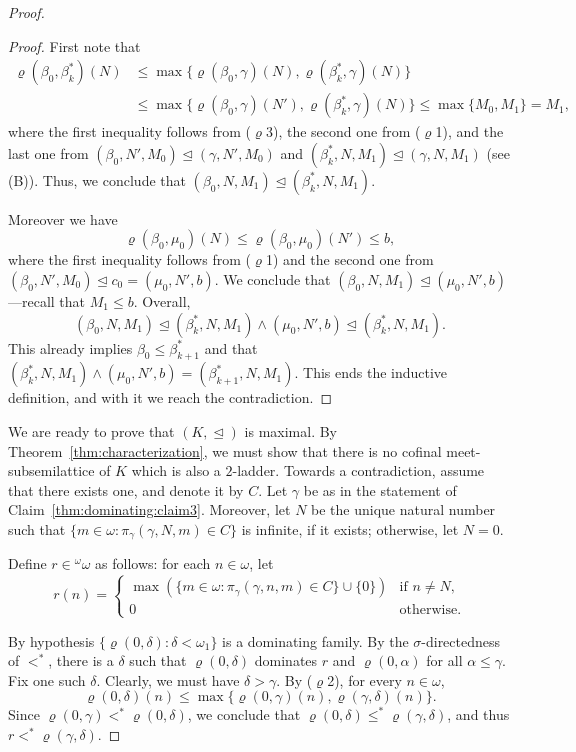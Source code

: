 \documentclass[]{amsart}
\theoremstyle{definition}
\theoremstyle{remark}
\begin{document}
\begin{proof}
\begin{proof}
First note that 
\begin{align*}
\varrho(\beta_0, \beta^*_k)(N) &\le  \max\{\varrho(\beta_0, \gamma)(N), \varrho(\beta^*_k, \gamma)(N)\}\\&\le \max\{\varrho(\beta_0, \gamma)(N'), \varrho(\beta^*_k, \gamma)(N)\} \le \max\{M_0, M_1\} = M_1,
\end{align*}
where the first inequality follows from ($\varrho$3), the second one from ($\varrho$1), and the last one from $(\beta_0, N', M_0) \trianglelefteq (\gamma, N', M_0)$ and $(\beta^*_k, N, M_1) \trianglelefteq (\gamma, N, M_1)$ (see (B)). Thus, we conclude that $(\beta_0, N, M_1) \trianglelefteq (\beta^*_k, N, M_1)$.


Moreover we have
\[
\varrho(\beta_0, \mu_0)(N) \le \varrho(\beta_0, \mu_0)(N') \le b,
\]
where the first inequality follows from ($\varrho$1) and the second one from $(\beta_0, N', M_0) \trianglelefteq c_0 = (\mu_0, N', b)$.
We conclude that $(\beta_0, N, M_1) \trianglelefteq (\mu_0, N', b)$---recall that $M_1 \le b$. Overall,
\[
(\beta_0, N, M_1) \trianglelefteq (\beta^*_k, N, M_1) \wedge (\mu_0, N', b) \trianglelefteq (\beta^*_k, N, M_1).
\]
This already implies $\beta_0 \le \beta^*_{k+1}$ and that $(\beta^*_k, N, M_1) \wedge (\mu_0, N', b) = (\beta^*_{k+1}, N, M_1)$. This ends the inductive definition, and with it we reach the contradiction.
\end{proof}

We are ready to prove that $(K, \trianglelefteq)$ is maximal. By Theorem~\ref{thm:characterization}, we must show that there is no cofinal meet-subsemilattice of $K$ which is also a $2$-ladder. Towards a contradiction, assume that there exists one, and denote it by $C$. Let $\gamma$ be as in the statement of Claim~\ref{thm:dominating:claim3}. Moreover, let $N$ be the unique natural number such that $\{m \in \omega : \pi_\gamma (\gamma, N, m) \in C\}$ is infinite, if it exists; otherwise, let $N = 0$.

Define $r \in {}^\omega \omega$ as follows: for each $n \in \omega$, let
\[
r(n) = \begin{cases}
\max (\{m\in\omega : \pi_\gamma (\gamma, n, m) \in C\} \cup \{0\}) &\text{if } n \neq N,\\
0 &\text{otherwise}.
\end{cases}
\]

By hypothesis $\{\varrho(0, \delta):\delta < \omega_1\}$ is a dominating family. By the $\sigma$-directedness of $<^*$, there is a $\delta$ such that $\varrho(0, \delta)$ dominates $r$ and $\varrho(0, \alpha)$ for all $\alpha \le \gamma$. Fix one such $\delta$. Clearly, we must have $\delta > \gamma$. By ($\varrho$2), for every $n \in \omega$,
\[
\varrho(0, \delta)(n) \le \max\{\varrho(0, \gamma)(n), \varrho(\gamma, \delta)(n)\}.
\]
Since $\varrho(0, \gamma) <^* \varrho(0, \delta)$, we conclude that $\varrho(0, \delta) \le^* \varrho(\gamma, \delta)$, and thus $r <^* \varrho(\gamma, \delta)$. 


\end{proof}
\end{document}
